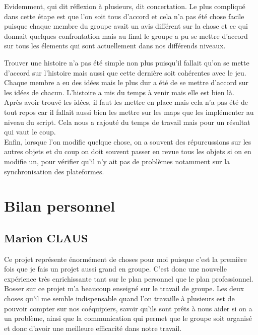 \documentclass[a4paper , 12pt]{article}
\begin{document}
Evidemment, qui dit réflexion à plusieurs, dit concertation. Le plus compliqué dans cette étape est que l’on soit tous d’accord et cela n’a pas été chose facile puisque chaque membre du groupe avait un avis différent sur la chose et ce qui donnait quelques confrontation mais au final le groupe a pu se mettre d’accord sur tous les élements qui sont actuellement dans nos différends niveaux.\\

\newpage

Trouver une histoire n’a pas été simple non plus puisqu’il fallait qu’on se mette d’accord sur l’histoire mais aussi que cette dernière soit cohérentes avec le jeu. Chaque membre a eu des idées mais le plus dur a été de se mettre d’accord sur les idées de chacun. L’histoire a mis du temps à venir mais elle est bien là.\\



Après avoir trouvé les idées, il faut les mettre en place mais cela n’a pas été de tout repos car il fallait aussi bien les mettre sur les maps que les implémenter au niveau du script. Cela nous a rajouté du temps de travail mais pour un résultat qui vaut le coup.\\

Enfin, lorsque l’on modifie quelque chose, on a souvent des répurcussions sur les autres objets et du coup on doit souvent passer en revue tous les objets si on en modifie un, pour vérifier qu’il n’y ait pas de problèmes notamment sur la synchronisation des plateformes.

\quad 

\newpage

\section{Bilan personnel}

\subsection{Marion CLAUS}

\quad

Ce projet représente énormément de choses pour moi puisque c’est la première fois que je fais un projet aussi grand en groupe. C’est donc une nouvelle expérience très enrichissante tant sur le plan personnel que le plan professionnel.\\

Bosser sur ce projet m’a beaucoup enseigné sur le travail de groupe. Les deux choses qu’il me semble indispensable quand l’on travaille à plusieurs est de pouvoir compter sur nos coéquipiers, savoir qu’ils sont prêts à nous aider si on a un problème, ainsi que la communication qui permet que le groupe soit organisé et donc d’avoir une meilleure efficacité dans notre travail.\\
\end{document}

